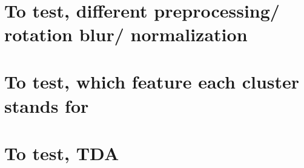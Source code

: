 \documentclass[11pt]{article}
\begin{document}
    \begin{center}
    \end{center}
    { \hspace*{\fill} \\}
    
    \hypertarget{to-test-different-preprocessing-rotation-blur-normalization}{%
\section{To test, different preprocessing/ rotation blur/
normalization}\label{to-test-different-preprocessing-rotation-blur-normalization}}

    \hypertarget{to-test-which-feature-each-cluster-stands-for}{%
\section{To test, which feature each cluster stands
for}\label{to-test-which-feature-each-cluster-stands-for}}

    \hypertarget{to-test-tda}{%
\section{To test, TDA}\label{to-test-tda}}


    
    
    
    
\end{document}
